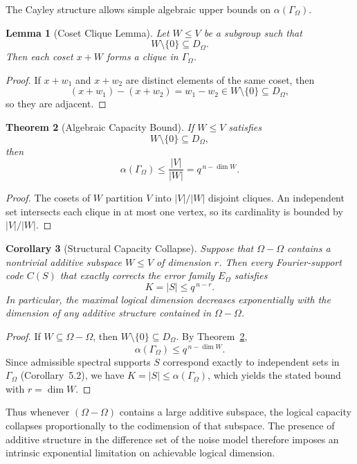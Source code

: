 \documentclass[a4paper,twocolumn,11pt,allowtoday]{quantumarticle}
\theoremstyle{plain}
\newtheorem{theorem}{Theorem}[section]
\newtheorem{lemma}[theorem]{Lemma}
\newtheorem{corollary}[theorem]{Corollary}
\theoremstyle{definition}
\theoremstyle{remark}
\begin{document}
The Cayley structure allows simple algebraic upper bounds on
$\alpha(\Gamma_\Omega)$.

\begin{lemma}[Coset Clique Lemma]
\label{lem:coset_clique}
Let $W \le V$ be a subgroup such that
\[
W \setminus \{0\} \subseteq D_\Omega.
\]
Then each coset $x+W$ forms a clique in $\Gamma_\Omega$.
\end{lemma}

\begin{proof}
If $x+w_1$ and $x+w_2$ are distinct elements of the same coset,
then
\[
(x+w_1)-(x+w_2)=w_1-w_2\in W\setminus\{0\}\subseteq D_\Omega,
\]
so they are adjacent.
\end{proof}

\begin{theorem}[Algebraic Capacity Bound]
\label{thm:algebraic_capacity_bound}
If $W \le V$ satisfies
\[
W \setminus \{0\} \subseteq D_\Omega,
\]
then
\[
\alpha(\Gamma_\Omega)
\le
\frac{|V|}{|W|}
=
q^{\,n-\dim W}.
\]
\end{theorem}

\begin{proof}
The cosets of $W$ partition $V$ into $|V|/|W|$ disjoint cliques.
An independent set intersects each clique in at most one vertex,
so its cardinality is bounded by $|V|/|W|$.
\end{proof}

\begin{corollary}[Structural Capacity Collapse]
\label{cor:structural_collapse}
Suppose that $\Omega-\Omega$ contains a nontrivial additive subspace
$W \le V$ of dimension $r$. Then every Fourier-support code
$C(S)$ that exactly corrects the error family $E_\Omega$
satisfies
\[
K = |S| \le q^{\,n-r}.
\]
In particular, the maximal logical dimension decreases exponentially
with the dimension of any additive structure contained in
$\Omega-\Omega$.
\end{corollary}

\begin{proof}
If $W \subseteq \Omega-\Omega$, then
$W \setminus \{0\} \subseteq D_\Omega$.
By Theorem~\ref{thm:algebraic_capacity_bound},
\[
\alpha(\Gamma_\Omega) \le q^{\,n-\dim W}.
\]
Since admissible spectral supports $S$ correspond exactly to
independent sets in $\Gamma_\Omega$ (Corollary~5.2),
we have $K=|S| \le \alpha(\Gamma_\Omega)$,
which yields the stated bound with $r=\dim W$.
\end{proof}

Thus whenever $(\Omega-\Omega)$ contains a large additive subspace,
the logical capacity collapses proportionally to the codimension
of that subspace. The presence of additive structure in the
difference set of the noise model therefore imposes an intrinsic
exponential limitation on achievable logical dimension.
\end{document}
